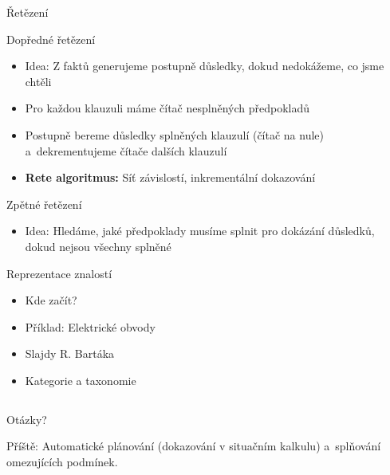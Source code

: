 \documentclass{beamer}
\begin{document}
\begin{frame}{Řetězení}
\begin{block}{Dopředné řetězení}
\begin{itemize}
\item Idea: Z faktů generujeme postupně důsledky, dokud nedokážeme, co jsme chtěli
\item Pro každou klauzuli máme čítač nesplněných předpokladů
\item Postupně bereme důsledky splněných klauzulí (čítač na nule) a~dekrementujeme čítače dalších klauzulí
\item {\bf Rete algoritmus:} Síť závislostí, inkrementální dokazování
\end{itemize}
\end{block}

\begin{block}{Zpětné řetězení}
\begin{itemize}
\item Idea: Hledáme, jaké předpoklady musíme splnit pro dokázání důsledků, dokud nejsou všechny splněné
\end{itemize}
\end{block}
\end{frame}

\begin{frame}{Reprezentace znalostí}
\begin{itemize}
\item Kde začít?
\item Příklad: Elektrické obvody
\item Slajdy R. Bartáka
\item Kategorie a taxonomie
\end{itemize}
\end{frame}

\subsection{}
\begin{frame}{Otázky?}
\begin{center}
Příště: Automatické plánování (dokazování v situačním kalkulu) a~splňování omezujících podmínek.
\end{center}
\end{frame}
\end{document}

